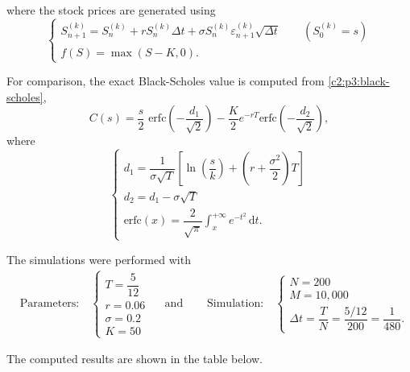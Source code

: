 where the stock prices are generated using
\[
	\begin{cases}
		S_{n+1}^{(k)} = S_n^{(k)} + rS_n^{(k)}\Delta t + \sigma S_n^{(k)}\varepsilon_{n+1}^{(k)}\sqrt{\Delta t} \qquad (S_0^{(k)} = s) \\
		f(S) = \max(S - K, 0).
	\end{cases}
\]

For comparison, the exact Black-Scholes value is computed from \eqref{c2:p3:black-scholes},
\begin{equation*}
	C(s) = \dfrac{s}{2} \text{ erfc}\left(-\dfrac{d_1}{\sqrt{2}}\right) - \dfrac{K}{2} e^{-rT} \text{erfc}\left(-\dfrac{d_2}{\sqrt{2}}\right),
\end{equation*}
where
\[
\begin{cases}
	d_1 = \dfrac{1}{\sigma \sqrt{T}} \left[ \ln\left(\dfrac{s}{k}\right) + \left(r + \dfrac{\sigma^2}{2}\right) T \right] \\[0.3cm]
	d_2 = d_1 - \sigma \sqrt{T} \\
	\text{erfc}(x) = \dfrac{2}{\sqrt{\pi}} \displaystyle\int_x^{+\infty} e^{-t^2} \, \mathrm{d}t.
\end{cases}
\]

The simulations were performed with
\begin{equation*}
	\begin{aligned}
		&\text{Parameters:} \quad 
		\begin{cases}
			T = \dfrac{5}{12} \\
			r = 0.06 \\
			\sigma = 0.2 \\
			K = 50
		\end{cases}
		\quad \text{ and } \quad
		&\text{Simulation:} \quad
		\begin{cases}
			N = 200 \\
			M = 10{,}000 \\[0.1cm]
			\Delta t = \dfrac{T}{N} = \dfrac{5/12}{200} = \dfrac{1}{480}.
		\end{cases}
	\end{aligned}
\end{equation*}

The computed results are shown in the table below.

